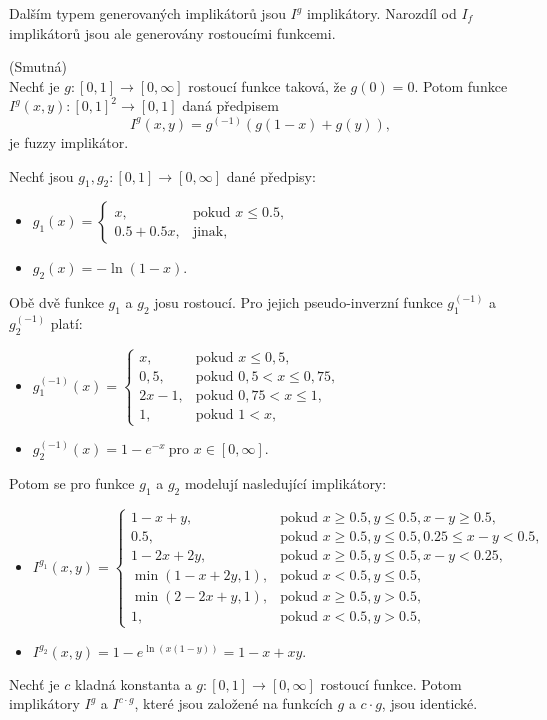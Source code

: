 Dalším typem generovaných implikátor\r u jsou $I^g$ implikátory. Narozdíl od $I_f$ implikátor\r u jsou ale generovány rostoucími funkcemi.

\begin{sentence}(Smutn\'a)\\
    Nech\v t je  $g:[0,1]\rightarrow [0,\infty]$ rostoucí funkce takov\'a, \v ze $g(0)=0$. 
    Potom funkce $I^g(x,y):[0,1]^2 \rightarrow [0,1]$ dan\'a předpisem
    \begin{equation}\label{g}
    I^g(x,y)=g^{(-1)}(g(1-x)+g(y)),
    \end{equation}
    je fuzzy implik\'ator.\\
\end{sentence}

\begin{example}
\cite{hlinena}
    Nech\v t jsou $g_1, g_2:[0,1] \rightarrow [0,\infty]$ 
    dan\'e předpisy:
    \begin{itemize}
    \item $g_1(x)=\begin{cases}  x,    &\mbox{pokud $x \leq 0.5$}, \\
    0.5+0.5x,      &\text{jinak,} \end{cases}$
    \item $g_2(x)=-\ln(1-x).$
    \end{itemize}
    Obě dvě funkce $g_1$ a $g_2$ josu rostoucí.
    Pro jejich pseudo-inverzn\'i funkce  $g_1^{(-1)}$ a $g_2^{(-1)}$ plat\'i:
    \begin{itemize}
    \item $g_1^{(-1)}(x)=\begin{cases} x, &\mbox{pokud $x \leq 0,5$}, \\
    0,5,   &\mbox{pokud $0,5 < x \leq 0,75$}, \\
    2x-1,   &\mbox{pokud $0,75 < x \leq 1$}, \\
    1,   &\mbox{pokud $1 < x$}, \end{cases}$
    \item $g_2^{(-1)}(x)=1-e^{-x} ~ \mbox{pro $x \in [0, \infty]$}.$
    \end{itemize}
    Potom se pro funkce $g_1$ a $g_2$ modelují nasleduj\'icí implik\'atory:
    \begin{itemize}
    \item $I^{g_1}(x,y)=\begin{cases}  1-x+y,      &\mbox{pokud $x \geq 0.5, y \leq 0.5, x-y \geq 0.5$}, \\
    0.5,      &\mbox{pokud $x \geq 0.5, y \leq 0.5, 0.25 \leq x-y < 0.5$}, \\
    1-2x+2y,      &\mbox{pokud $x \geq 0.5, y \leq 0.5, x-y < 0.25$}, \\
    \min(1-x+2y,1),       &\mbox{pokud $x < 0.5, y \leq 0.5$}, \\
    \min(2-2x+y,1),       &\mbox{pokud $x \geq 0.5, y>0.5$}, \\
    1,       &\mbox{pokud $x < 0.5, y > 0.5,$} \end{cases}$
    \item $I^{g_2}(x,y)=1-e^{\ln(x(1-y))}=1-x+xy.$
    \end{itemize}
\end{example}

\begin{sentence}
\cite{hlinena}
    Nech\v t je $c$ kladn\'a konstanta a $g:[0,1] \to [0,\infty]$
    rostoucí  funkce. Potom implik\'atory $I^g$ a $I^{c \cdot g}$,
    které jsou zalo\v zen\'e na  funkcích $g$ a $c \cdot g$, jsou
    identick\'e.
\end{sentence}